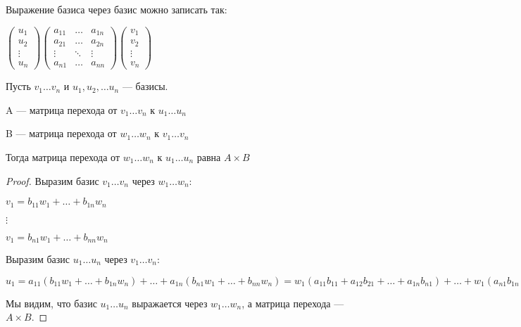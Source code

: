 \begin{remark}
    Выражение базиса через базис можно записать так:

    $\left(
    \begin{array}{c}
        u_{1} \\
        u_{2} \\
        \vdots \\
        u_{n} 
    \end{array}
    \right) \left(
        \begin{array}{ccc}
            a_{11} & \ldots & a_{1n}\\
            a_{21} & \ldots & a_{2n}\\
            \vdots & \ddots & \vdots\\
            a_{n1} &\ldots & a_{nn}
        \end{array}
        \right) \left(
            \begin{array}{c}
                v_{1}\\
                v_{2}\\
                \vdots\\
                v_{n}
            \end{array}
            \right)$    
\end{remark}

\begin{theorem}
    Пусть $v_1 \ldots v_n$ и $u_1, u_2, \ldots u_n$ --- базисы.

    A --- матрица перехода от $v_1 \ldots v_n$ к $u_1 \ldots u_n$
    
    B --- матрица перехода от $w_1 \ldots w_n$ к $v_1 \ldots v_n$

    Тогда матрица перехода от $w_1 \ldots w_n$ к $u_1 \ldots u_n$ равна $A \times B$
\end{theorem}

\begin{proof} Выразим базис $v_1 \ldots v_n$ через $w_1 \ldots w_n$:
    
    $v_1 = b_{11}w_1 + \ldots + b_{1n}w_n$
    
    $\vdots$

    $v_1 = b_{n1}w_1 + \ldots + b_{nn}w_n$
   
    Выразим базис $u_1 \ldots u_n$ через $v_1 \ldots v_n$:

    $u_1 = a_{11}(b_{11}w_1 + \ldots + b_{1n}w_n) + \ldots + a_{1n}(b_{n1}w_1 + \ldots + b_{nn}w_n) = w_1(a_{11}b_{11} + a_{12}b_{21} + \ldots + a_{1n}b_{n1}) + \ldots + w_1(a_{n1}b_{1n} + a_{n2}b_{2n} + \ldots + a_{nn}b_{nn})$

    Мы видим, что базис $u_1 \ldots u_n$ выражается через $w_1 \ldots w_n$, а матрица перехода --- $A \times B$.
\end{proof}

